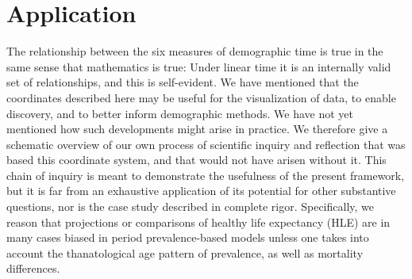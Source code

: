 \documentclass[12pt,oneside,a4paper]{article} %
\theoremstyle{definition}
\begin{document}
%
%

\FloatBarrier

\section{Application}
\label{sec:app}
The relationship between the six measures of demographic time is true in the
same sense that mathematics is true: Under linear time it is an internally valid
set of relationships, and this is self-evident. We have mentioned that the
coordinates described here may be useful for the visualization of data, to
enable discovery, and to better inform demographic methods. We have not yet
mentioned how such developments might arise in practice. We therefore give a
schematic overview of our own process of scientific inquiry and reflection that was based this coordinate system, and
that would not have arisen without it. This chain of inquiry is meant to demonstrate the
usefulness of the present framework, but it is far from an exhaustive
application of its potential for other substantive questions, nor is the case
study described in complete rigor. Specifically, we reason that
projections or comparisons of healthy life expectancy (HLE) are in many
cases biased in period prevalence-based models unless one takes into account the
thanatological age pattern of prevalence, as well as mortality differences.
\end{document}
